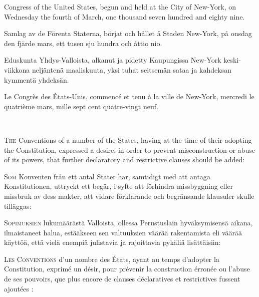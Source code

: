 \documentclass[a4paper,landscape,12pt]{article}
\begin{document}
\begin{minipage}[t]{0.22\textwidth}
Congress of the United States, begun and held at the City of New-York, on Wednesday the fourth of March, one thousand seven hundred and eighty nine.
\end{minipage}\textwidth
\begin{minipage}[t]{0.22\textwidth}
Samlag av de Förenta Staterna, börjat och hållet å Staden New-York, på onsdag den fjärde mars, ett tusen sju hundra och åttio nio.
\end{minipage}\textwidth
\begin{minipage}[t]{0.22\textwidth}
Eduskunta Yhdys-Valloista, alkanut ja pidetty Kaupungissa New-York keski-viikkona neljäntenä maaliskuuta, yksi tuhat seitsemän sataa ja kahdeksan kymmentä yhdeksän.
\end{minipage}\textwidth
\begin{minipage}[t]{0.22\textwidth}
Le Congrès des États-Unis, commencé et tenu à la ville de New-York, mercredi le quatrième mars, mille sept cent quatre-vingt neuf.
\end{minipage}

~

\begin{minipage}[t]{0.22\textwidth}
\textsc{The} Conventions of a number of the States, having at the time of their adopting the Constitution, expressed a desire, in order to prevent misconstruction or abuse of its powers, that further declaratory and restrictive clauses should be added:
\end{minipage}\textwidth
\begin{minipage}[t]{0.22\textwidth}
\textsc{Som} Konventen från ett antal Stater har, samtidigt med att antaga Konstitutionen, uttryckt ett begär, i syfte att förhindra missbyggning eller missbruk av dess makter, att vidare förklarande och begränsande klausuler skulle tilläggas:
\end{minipage}\textwidth
\begin{minipage}[t]{0.22\textwidth}
\textsc{Sopimuksien} lukumäärästä Valloista, ollessa Perustuslain hyväksymisensä aikana, ilmaistaneet halua, estääkseen sen valtuuksien väärää rakentamista eli väärää käyttöä, että vielä enempiä julistavia ja rajoittavia pykäliä lisättäisiin:
\end{minipage}\textwidth
\begin{minipage}[t]{0.22\textwidth}
\textsc{Les Conventions} d'un nombre des États, ayant au temps d'adopter la Constitution, exprimé un désir, pour prévenir la construction érronée ou l'abuse de ses pouvoirs, que plus encore de clauses déclaratives et restrictives fussent ajoutées :
\end{minipage}
\end{document}
